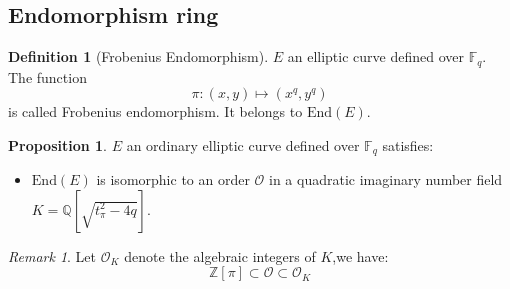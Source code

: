 \documentclass[10pt,a4paper]{beamer}
\theoremstyle{plain}
\theoremstyle{definition}
\theoremstyle{definition}
\theoremstyle{definition}
\newtheorem{prop}[thm]{Proposition}
\theoremstyle{definition}
\newtheorem{defi}[thm]{Definition}
\theoremstyle{remark}
\newtheorem{rem}[thm]{Remark}
\theoremstyle{remark}
\begin{document}
%


\begin{frame}
\section{Endomorphism ring}

\begin{defi}[Frobenius Endomorphism]
$E$ an elliptic curve defined over $\mathbb{F}_q$. The function \[ \pi:(x,y) \mapsto (x^q,y^q)\] is called Frobenius endomorphism. It belongs to $\mathrm{End}(E)$.
\end{defi}

\begin{prop} \label{prop:p-tor}
$E$ an ordinary elliptic curve defined over $\mathbb{F}_q$ satisfies:
\begin{itemize}
\item  $\mathrm{End}(E)$ is isomorphic to an order $\mathcal{O}$ in a quadratic imaginary number field $K=\mathbb{Q}[\sqrt{t_{\pi}^2-4q}]$.
\end{itemize}
\end{prop}


\begin{rem}
Let $\mathcal{O}_K$ denote the algebraic integers of $K$,we have:
\[ \mathbb{Z}[\pi] \subset \mathcal{O} \subset \mathcal{O}_K \]
\end{rem}


\end{frame}

%
%
\end{document}
